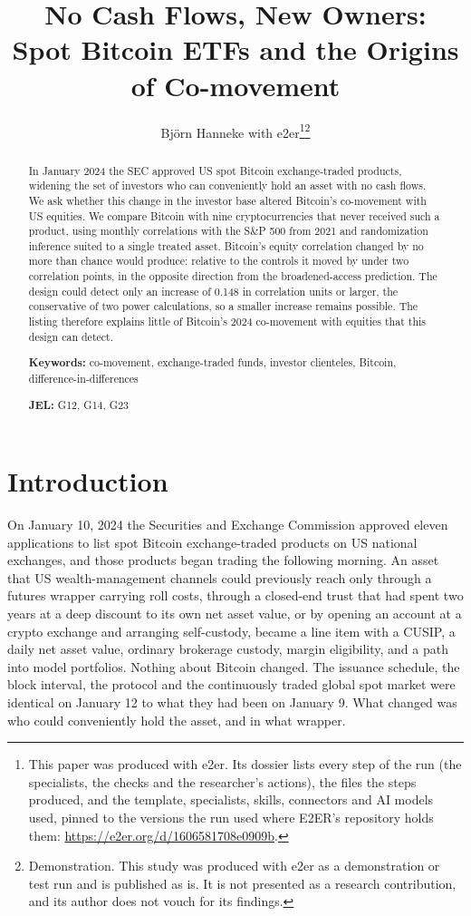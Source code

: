 \documentclass[12pt,a4paper]{article}
\title{No Cash Flows, New Owners:\\ Spot Bitcoin ETFs and the Origins of Co-movement}
\author{Björn Hanneke with e2er\thanks{This paper was produced with e2er. Its dossier lists every step of the run (the specialists, the checks and the researcher's actions), the files the steps produced, and the template, specialists, skills, connectors and AI models used, pinned to the versions the run used where E2ER's repository holds them: \url{https://e2er.org/d/1606581708e0909b}.}\thanks{Demonstration. This study was produced with e2er as a demonstration or test run and is published as is. It is not presented as a research contribution, and its author does not vouch for its findings.}}
\date{}
\begin{document}
\maketitle

\begin{abstract}
\noindent In January 2024 the SEC approved US spot Bitcoin exchange-traded products, widening the set of investors who can conveniently hold an asset with no cash flows. We ask whether this change in the investor base altered Bitcoin's co-movement with US equities. We compare Bitcoin with nine cryptocurrencies that never received such a product, using monthly correlations with the S\&P 500 from 2021 and randomization inference suited to a single treated asset. Bitcoin's equity correlation changed by no more than chance would produce: relative to the controls it moved by under two correlation points, in the opposite direction from the broadened-access prediction.
The design could detect only an increase of 0.148 in correlation units or larger, the conservative of two power calculations, so a smaller increase remains possible.
The listing therefore explains little of Bitcoin's 2024 co-movement with equities that this design can detect.

\medskip
\noindent\textbf{Keywords:} co-movement, exchange-traded funds, investor clienteles, Bitcoin, difference-in-differences

\noindent\textbf{JEL:} G12, G14, G23
\end{abstract}

\newpage
\onehalfspacing

\section{Introduction}

On January 10, 2024 the Securities and Exchange Commission approved eleven applications to list spot Bitcoin exchange-traded products on US national exchanges, and those products began trading the following morning.
An asset that US wealth-management channels could previously reach only through a futures wrapper carrying roll costs, through a closed-end trust that had spent two years at a deep discount to its own net asset value, or by opening an account at a crypto exchange and arranging self-custody, became a line item with a CUSIP, a daily net asset value, ordinary brokerage custody, margin eligibility, and a path into model portfolios. Nothing about Bitcoin changed. The issuance schedule, the block interval, the protocol and the continuously traded global spot market were identical on January 12 to what they had been on January 9. What changed was who could conveniently hold the asset, and in what wrapper.
\end{document}
